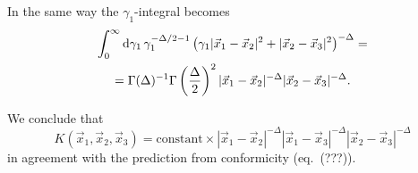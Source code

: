 In the same way the $\gamma_1$-integral becomes
\begin{multline*}
\int_0^\infty \mathrm{d}\gamma_1\, \gamma_1^{-\Delta/2-1} \left( \gamma_1 |\vec{x}_1-\vec{x}_2|^2 + |\vec{x}_2-\vec{x}_3|^2 \right)^{-\Delta} = \\
= \Gamma(\Delta)^{-1} \Gamma\left(\frac{\Delta}{2}\right)^2 |\vec{x}_1-\vec{x}_2|^{-\Delta} |\vec{x}_2-\vec{x}_3|^{-\Delta}.
\end{multline*}

We conclude that
$$
K(\vec{x}_1,\vec{x}_2,\vec{x}_3) = \text{constant} \times 
  |\vec{x}_1-\vec{x}_2|^{-\Delta}
  |\vec{x}_1-\vec{x}_3|^{-\Delta}
  |\vec{x}_2-\vec{x}_3|^{-\Delta}
$$
in agreement with the prediction from conformicity (eq.~(???)).




